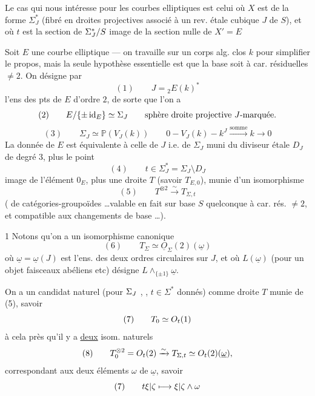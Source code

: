 Le cas qui nous intéresse pour les courbes elliptiques est celui où $X$ est de la forme $\Sigma_J^*$ (fibré en droites projectives associé à un rev. étale cubique $J$ de $S$),  et où $t$ est la section de $\Sigma_J^{*}/S$  image de la section nulle de $X'=E$ \unsure{\ldots}

Soit $E$ une courbe elliptique --- on travaille sur un corps alg. clos $k$ pour simplifier le propos, mais la seule hypothèse essentielle est que la base soit à car. résiduelles $\ne2$. On désigne par 
\[
(1)\qquad J={}_2E(k)^*
\]
l'ens des pts de $E$ d'ordre $2$, de sorte que l'on a
\[
(2)\qquad E/\{\pm\operatorname{id}_E\}\simeq\Sigma_J
\qquad\text{sphère droite projective $J$-marquée.}
\]
\[
(3)\qquad\Sigma_J\simeq\mathbb P(V_J(k))
\qquad 0\mathbin{-}V_J(k)\mathbin{-}k^J\xrightarrow{\text{somme}}k\longrightarrow0
\]
La donnée de $E$ est équivalente à celle de $J$ i.e. de $\Sigma_J$ muni du diviseur étale $D_J$ de degré $3$, plus le point
\[
(4)\qquad t\in\Sigma_J^*=\Sigma_J\setminus D_J
\]
image de l'élément $0_E$, plus une droite $T$  (savoir $T_{E,0}$), munie d'un isomorphisme
\[
(5)\qquad T^{\otimes2}\xrightarrow{\sim}T_{\Sigma,t}
\]
(  de catégories-groupoïdes \ldots valable en fait sur base $S$ quelconque à car. rés. $\ne2$, et compatible aux changements de base \ldots).

1 Notons qu'on a un isomorphisme canonique
\[
(6)\qquad T_\Sigma\simeq\underline O_\Sigma(2)(\underline\omega)
\]
où $\underline\omega=\underline\omega(J)$ est l'ens. des deux ordres circulaires sur $J$, et où $L(\underline\omega)$ (pour un objet   faisceaux abéliens etc) désigne $L\wedge_{\{\pm1\}}\underline\omega$.

On a un candidat naturel (pour $\Sigma_{J}$ ,  , $t\in\Sigma^*$ donnés) comme droite $T$ munie de (5), savoir
\[
(7)\qquad T_0\simeq O_t(1)
\]
à cela près qu'il y a \uline{deux} isom. naturels
\[
(8)\qquad T_0^{\otimes2}=O_t(2)\xrightarrow{\sim}T_{\Sigma,t}\simeq O_t(2)(\underline\omega),
\]
correspondant aux deux éléments $\omega$ de $\underline\omega$, savoir
\[
(7)\qquad t\xi|\zeta\longmapsto\xi|\zeta\wedge\omega
\]

